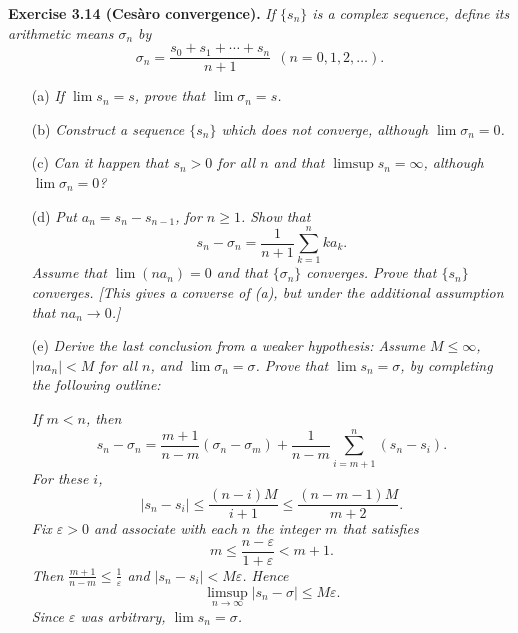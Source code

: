 \documentclass{article}
\begin{document}
\textbf{Exercise 3.14 (Ces\`aro convergence).}
\emph{If $\{s_n\}$ is a complex sequence, define its arithmetic means $\sigma_n$ by
$$\sigma_n
= \frac{s_0 + s_1 + \cdots + s_n}{n+1} \:\: (n=0,1,2,\ldots).$$}
\begin{enumerate}
\item[(a)]
\emph{If $\lim s_n = s$, prove that $\lim \sigma_n = s$.}
\item[(b)]
\emph{Construct a sequence $\{s_n\}$ which does not converge, although $\lim \sigma_n = 0$.}
\item[(c)]
\emph{Can it happen that $s_n > 0$ for all $n$ and that $\limsup s_n = \infty$,
although $\lim \sigma_n = 0$?}
\item[(d)]
\emph{Put $a_n = s_n - s_{n-1}$, for $n \geq 1$.
Show that
$$s_n - \sigma_n = \frac{1}{n+1} \sum_{k=1}^{n} ka_k.$$
Assume that $\lim (na_n) = 0$ and that $\{\sigma_n\}$ converges.
Prove that $\{s_n\}$ converges.
[This gives a converse of (a), but under the additional assumption that $na_n \to 0$.]}
\item[(e)]
\emph{Derive the last conclusion from a weaker hypothesis:
Assume $M \leq \infty$, $|na_n| < M$ for all $n$, and $\lim \sigma_n = \sigma$.
Prove that $\lim s_n = \sigma$, by completing the following outline:}

\emph{If $m < n$, then
$$s_n - \sigma_n
= \frac{m+1}{n-m}(\sigma_n - \sigma_m)
  + \frac{1}{n-m}\sum_{i=m+1}^{n}(s_n - s_i).$$
For these $i$,
$$|s_n - s_i|
\leq \frac{(n-i)M}{i+1}
\leq \frac{(n-m-1)M}{m+2}.$$
Fix $\varepsilon > 0$ and associate with each $n$ the integer $m$ that satisfies
$$m \leq \frac{n-\varepsilon}{1+\varepsilon} < m+1.$$
Then $\frac{m+1}{n-m} \leq \frac{1}{\varepsilon}$ and $|s_n - s_i| < M\varepsilon$.
Hence
$$\limsup_{n \to \infty} |s_n - \sigma| \leq M\varepsilon.$$
Since $\varepsilon$ was arbitrary, $\lim s_n = \sigma$.} \\
\end{enumerate}
\end{document}
